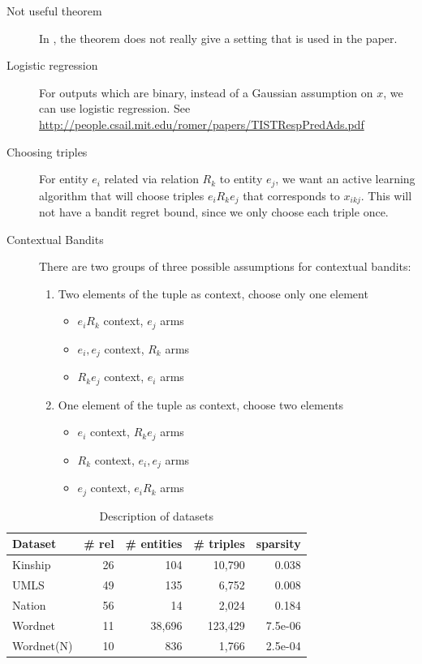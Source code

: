\documentclass{article}
\begin{document}
\begin{description}
  \item[Not useful theorem] In \cite{kawale2015efficient}, the theorem does not really give
  a setting that is used in the paper.
  \item[Logistic regression] For outputs which are binary, instead of a Gaussian assumption on
  $x$, we can use logistic regression. See
   \url{http://people.csail.mit.edu/romer/papers/TISTRespPredAds.pdf}
  \item[Choosing triples] For entity $e_i$ related via relation $R_k$ to entity $e_j$, we want
  an active learning algorithm that will choose triples $e_i R_k e_j$ that corresponds to
  $x_{ikj}$. This will not have a bandit regret bound, since we only choose each triple once.
  \item[Contextual Bandits] There are two groups of three possible assumptions for contextual
  bandits:
  \begin{enumerate}
    \item Two elements of the tuple as context, choose only one element
    \begin{itemize}
      \item $e_iR_k$ context, $e_j$ arms
      \item $e_i, e_j$ context, $R_k$ arms
      \item $R_ke_j$ context, $e_i$ arms
    \end{itemize}
    \item One element of the tuple as context, choose two elements
    \begin{itemize}
      \item $e_i$ context, $R_k e_j$ arms
      \item $R_k$ context, $e_i, e_j$ arms
      \item $e_j$ context, $e_iR_k$ arms
    \end{itemize}
  \end{enumerate}
\end{description}

\begin{table}
\centering
\caption{\label{tbl:dataset}Description of datasets}
\begin{tabular}{l | r | r | r | r}
Dataset &  \# rel & \# entities & \# triples & sparsity \\ \hline
Kinship & 26 & 104  & 10,790 & 0.038 \\
UMLS & 49 &135  & 6,752 & 0.008 \\
Nation & 56 & 14  & 2,024 & 0.184 \\
Wordnet & 11 & 38,696  &123,429 & 7.5e-06\\
Wordnet(N) & 10 & 836 & 1,766 & 2.5e-04\\
\end{tabular}
\end{table}




\end{document}
